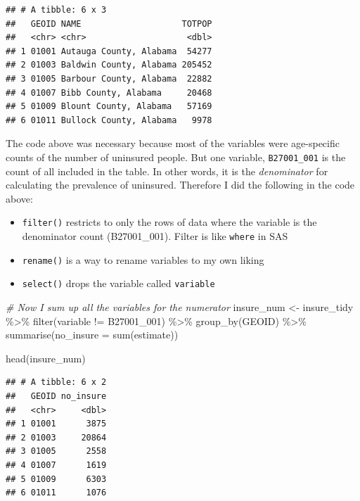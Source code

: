 \documentclass[
]{book}
\newenvironment{Shaded}{\begin{snugshade}}{\end{snugshade}}
\newcommand{\AttributeTok}[1]{\textcolor[rgb]{0.77,0.63,0.00}{#1}}
\newcommand{\CommentTok}[1]{\textcolor[rgb]{0.56,0.35,0.01}{\textit{#1}}}
\newcommand{\FunctionTok}[1]{\textcolor[rgb]{0.00,0.00,0.00}{#1}}
\newcommand{\NormalTok}[1]{#1}
\newcommand{\OtherTok}[1]{\textcolor[rgb]{0.56,0.35,0.01}{#1}}
\newcommand{\SpecialCharTok}[1]{\textcolor[rgb]{0.00,0.00,0.00}{#1}}
\newcommand{\StringTok}[1]{\textcolor[rgb]{0.31,0.60,0.02}{#1}}
\providecommand{\tightlist}{%
  \setlength{\itemsep}{0pt}\setlength{\parskip}{0pt}}
\begin{document}
\begin{verbatim}
## # A tibble: 6 x 3
##   GEOID NAME                    TOTPOP
##   <chr> <chr>                    <dbl>
## 1 01001 Autauga County, Alabama  54277
## 2 01003 Baldwin County, Alabama 205452
## 3 01005 Barbour County, Alabama  22882
## 4 01007 Bibb County, Alabama     20468
## 5 01009 Blount County, Alabama   57169
## 6 01011 Bullock County, Alabama   9978
\end{verbatim}

The code above was necessary because most of the variables were age-specific counts of the number of uninsured people. But one variable, \texttt{B27001\_001} is the count of all included in the table. In other words, it is the \emph{denominator} for calculating the prevalence of uninsured. Therefore I did the following in the code above:

\begin{itemize}
\tightlist
\item
  \texttt{filter()} restricts to only the rows of data where the variable is the denominator count (B27001\_001). Filter is like \texttt{where} in SAS
\item
  \texttt{rename()} is a way to rename variables to my own liking
\item
  \texttt{select()} drops the variable called \texttt{variable}
\end{itemize}

\begin{Shaded}
\begin{Highlighting}[]
\CommentTok{\# Now I sum up all the variables for the numerator}
\NormalTok{insure\_num }\OtherTok{\textless{}{-}}\NormalTok{ insure\_tidy }\SpecialCharTok{\%\textgreater{}\%}
  \FunctionTok{filter}\NormalTok{(variable }\SpecialCharTok{!=} \StringTok{\textquotesingle{}B27001\_001\textquotesingle{}}\NormalTok{) }\SpecialCharTok{\%\textgreater{}\%}
  \FunctionTok{group\_by}\NormalTok{(GEOID) }\SpecialCharTok{\%\textgreater{}\%}
  \FunctionTok{summarise}\NormalTok{(}\AttributeTok{no\_insure =} \FunctionTok{sum}\NormalTok{(estimate))}

\FunctionTok{head}\NormalTok{(insure\_num)}
\end{Highlighting}
\end{Shaded}

\begin{verbatim}
## # A tibble: 6 x 2
##   GEOID no_insure
##   <chr>     <dbl>
## 1 01001      3875
## 2 01003     20864
## 3 01005      2558
## 4 01007      1619
## 5 01009      6303
## 6 01011      1076
\end{verbatim}
\end{document}
